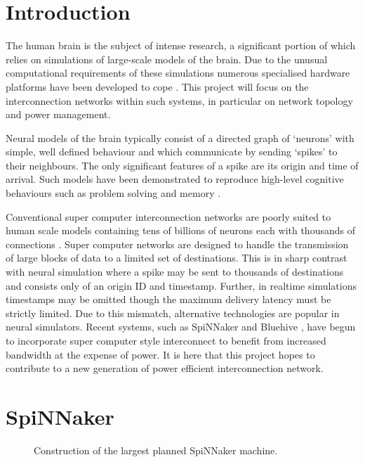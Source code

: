 \section{Introduction}

The human brain is the subject of intense research, a significant portion of
which relies on simulations of large-scale models of the brain. Due to the
unusual computational requirements of these simulations numerous specialised
hardware platforms have been developed to cope
\cite{furber07,moore12,maguire07,choudhary12,misra10}. This project will focus
on the interconnection networks within such systems, in particular on network
topology and power management.

Neural models of the brain typically consist of a directed graph of `neurons'
with simple, well defined behaviour and which communicate by sending `spikes'
to their neighbours. The only significant features of a spike are its origin and
time of arrival. Such models have been demonstrated to reproduce high-level
cognitive behaviours such as problem solving and memory \cite{eliasmith12}. 

Conventional super computer interconnection networks are poorly suited to human
scale models containing tens of billions of neurons \cite{williams88} each with
thousands of connections \cite{kung88}. Super computer networks are designed to
handle the transmission of large blocks of data to a limited set of
destinations. This is in sharp contrast with neural simulation where a spike may
be sent to thousands of destinations and consists only of an origin ID and
timestamp. Further, in realtime simulations timestamps may be omitted though the
maximum delivery latency must be strictly limited. Due to this mismatch,
alternative technologies are popular in neural simulators. Recent systems, such
as SpiNNaker \cite{furber07} and Bluehive \cite{moore12}, have begun to
incorporate super computer style interconnect to benefit from increased
bandwidth at the expense of power. It is here that this project hopes to
contribute to a new generation of power efficient interconnection network.

\section{SpiNNaker}
	
	\begin{figure}
		\center
		
		
		\caption{Construction of the largest planned SpiNNaker machine.}
		\label{fig:spinnaker-abstractions}
	\end{figure}
	
